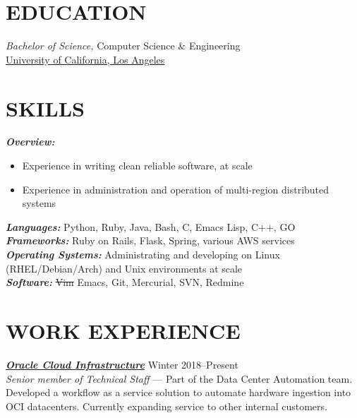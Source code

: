 \documentclass[line,letterpaper]{resume}
\begin{document}
\address{\ }
\address{\ }


\begin{resume}
    \vspace{-24pt}
    \section{\uppercase{Education}} {\sl Bachelor of Science,} \/
    Computer Science \& Engineering \\
    \underline{\href{http://cs.ucla.edu}{University of California, Los Angeles}}\\
    \vspace{-16pt}

 \section{\uppercase{Skills}}
    {\sl\textbf{Overview:}}\/
	\begin{itemize}
		\item Experience in writing clean reliable software, at scale
		\item Experience in administration and operation of multi-region distributed systems
	\end{itemize}
    {\sl\textbf{Languages:}}\/
    Python, Ruby, Java, Bash, C, Emacs Lisp, C++, GO \\
    {\sl\textbf{Frameworks:}}\/
	Ruby on Rails, Flask, Spring, various AWS services\\
    {\sl\textbf{Operating Systems:}}\/
	Administrating and developing on Linux (RHEL/Debian/Arch) and Unix environments at scale\\
    {\sl\textbf{Software:}}\/
	\sout{Vim} Emacs, Git, Mercurial, SVN, Redmine
    \vspace{-6pt}

	\section{\uppercase{Work Experience}}

	{\sl\textbf{\href{https://cloud.oracle.com/}{Oracle Cloud Infrastructure}}} \hfill Winter 2018--Present\\
    \emph{Senior member of Technical Staff } --- Part of the Data Center Automation team.
    Developed a workflow as a service solution to automate hardware ingestion into OCI
    datacenters. Currently expanding service to other internal customers.


\end{resume}
\end{document}

